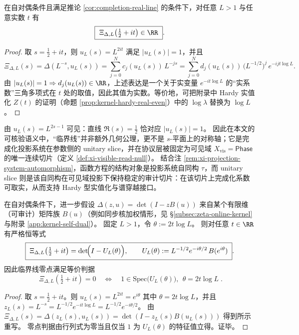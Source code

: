 \begin{proposition}\label{prop:xi-delta-L-critical-line-real}
在自对偶条件且满足推论 \ref{cor:completion-real-line} 的条件下，对任意 \(L>1\) 与任意实数 \(t\) 有
\[
\boxed{\ \Xi_{\Delta,L}\!\left(\tfrac12+it\right)\in\RR\ }.
\]
\end{proposition}
\begin{proof}
取 \(s=\tfrac12+it\)，则 \(u_L(s)=L^{2it}\) 满足 \(|u_L(s)|=1\)，并且
\[
\Xi_{\Delta,L}(s)
=\Delta(L^{-s},u_L(s))
=\sum_{j=0}^{N}c_j(u_L(s))\,L^{-js}
=\sum_{j=0}^{N}d_j(u_L(s))\,\bigl(L^{-1/2}\bigr)^{j}\,e^{-ijt\log L}.
\]
由 \(|u_L(s)|=1\Rightarrow d_j(u_L(s))\in\RR\)，上述表达是一个关于实变量 \(e^{-it\log L}\) 的“实系数”三角多项式在 \(t\) 处的取值，因此其值为实数。等价地，可把附录中 Hardy 实值化 \(Z(t)\) 的证明（命题 \ref{prop:kernel-hardy-real-even}）中的 \(\log\lambda\) 替换为 \(\log L\)。
\end{proof}

\begin{remark}\label{rem:xi-critical-line-unit-circle}
由 \(u_L(s)=L^{2s-1}\) 可见：直线 \(\Re(s)=\tfrac12\) 恰对应 \(|u_L(s)|=1\)。
因此在本文的可核验语义中，“临界线”并非额外几何公理，更不是 \(s\)-平面上的对称轴；它是完成化投影系统在参数侧的 unitary slice，并在协议层被固定为可见域 \(X_{\mathrm{vis}}=\mathsf{Phase}\) 的唯一连续切片（定义 \ref{def:xi-visible-read-null}）。
结合注 \ref{rem:xi-projection-system-automorphism}，函数方程的结构对象是投影系统自同构 \(\tau\)，而 unitary slice 则是该自同构在可见域投影下保持稳定的审计切片：在该切片上完成化系数可取实，从而支持 Hardy 型实值化与谱穿越接口。
\end{remark}

\begin{proposition}\label{prop:xi-unitary-slice-spectral-crossing}
在自对偶条件下，进一步假设
\(
\Delta(z,u)=\det(I-zB(u))
\)
来自某个有限维（可审计）矩阵族 \(B(u)\)（例如同步核加权情形，见 \S\ref{subsec:zeta-online-kernel} 与附录 \ref{app:kernel-self-dual}）。
固定 \(L>1\)，令 \(\theta:=2t\log L\)。
则对任意 \(t\in\RR\) 有严格恒等式
\[
\boxed{\;
\Xi_{\Delta,L}\!\left(\tfrac12+it\right)
=
\det\!\Bigl(I-U_L(\theta)\Bigr),\qquad
U_L(\theta):=L^{-1/2}e^{-i\theta/2}\,B(e^{i\theta})\; }.
\]
因此临界线零点满足等价判据
\[
\boxed{\;
\Xi_{\Delta,L}\!\left(\tfrac12+it\right)=0
\quad\Longleftrightarrow\quad
1\in\mathrm{Spec}\bigl(U_L(\theta)\bigr),\ \ \theta=2t\log L\; }.
\]
\end{proposition}
\begin{proof}
取 \(s=\tfrac12+it\)。则
\(
u_L(s)=L^{2it}=e^{i\theta}
\)
其中 \(\theta=2t\log L\)，并且
\(
z_L(s)=L^{-s}=L^{-1/2}e^{-it\log L}=L^{-1/2}e^{-i\theta/2}
\)。
由 \(\Xi_{\Delta,L}(s)=\Delta(z_L(s),u_L(s))=\det(I-z_L(s)B(u_L(s)))\) 得到所示重写。
零点判据由行列式为零当且仅当 \(1\) 为 \(U_L(\theta)\) 的特征值立得。证毕。
\end{proof}

